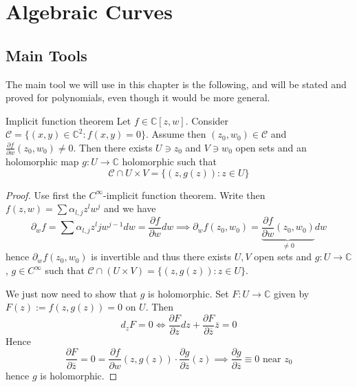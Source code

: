 \chapter{Algebraic Curves}
\section{Main Tools}

The main tool we will use in this chapter is the following, and will be
stated and proved for polynomials, even though it would be more general.

\begin{theorem}{Implicit function theorem}\label{thm:ift}
    Let \(f \in  \mathbb{C}[z, w]\). Consider \(\mathcal{C} = \{{(x, y)} \in
    \mathbb{C}^2 : f{(x, y)} = 0\} \). Assume then \({(z_{0}, w_{0})} \in
    \mathcal{C}\) and \(\frac{\partial f}{\partial w} {(z_{0}, w_{0})} \neq 0\).
    Then there exists \(U \ni z_{0}\) and \(V \ni w_{0}\) open sets and an
    holomorphic map \(g : U \to \mathbb{C}\) holomorphic such that
    \[
      \mathcal{C} \cap U \times  V = \{{(z, g{(z)})} : z \in U\} 
    \]
\end{theorem}

\begin{proof}{}
    Use first the \(C^{\infty}\)-implicit function theorem. Write then \(f {(z,
    w)} = \sum \alpha_{l,j} z^{l} w^{j} \) and we have 
    \[
      \partial_w f = \sum \alpha_{l, j} z^{l} j w^{j-1} dw = \frac{\partial
      f}{\partial w} dw \implies \partial_w f{(z_{0}, w_{0})} = \underbrace{\frac{\partial
      f}{\partial w}{(z_{0}, w_{0})}}_{\neq 0} dw
    \]
    hence \(\partial_w f{(z_{0}, w_{0})}\) is invertible and thus there exists
    \(U, V\) open sets and \(g : U \to \mathbb{C}\), \(g \in C^{\infty}\) such
    that \(\mathcal{C} \cap {(U \times  V)} = \{{(z, g{(z)})} : z \in U\} \).

    We just now need to show that \(g\) is holomorphic. Set \(F : U \to
    \mathbb{C}\) given by \(F{(z)} := f{(z, g{(z)})} = 0\) on \(U\). Then
    \[
      d_z F = 0 \iff \frac{\partial F}{\partial z} dz + \frac{\partial
      F}{\partial \overline{z}} \overline{z} = 0
    \]
    Hence
    \[
      \frac{\partial F}{\partial \overline{z}} = 0 = \frac{\partial f}{\partial
      w} {(z, g{(z)})} \cdot \frac{\partial g}{\partial \overline{z}}{(z)}
      \implies \frac{\partial g}{\partial \overline{z}} \equiv 0 \text{ near }
      z_{0}
    \]
    hence \(g\) is holomorphic.
\end{proof}

